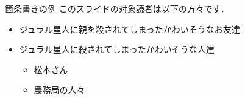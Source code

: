 \begin{frame}{箇条書きの例}
    このスライドの対象読者は以下の方々です．
    \begin{itemize}
        \item ジュラル星人に親を殺されてしまったかわいそうなお友達
        \item ジュラル星人に殺されてしまったかわいそうな人達
            \begin{itemize}
                \item 松本さん
                \item 農務局の人々
            \end{itemize}
    \end{itemize}
\end{frame}
